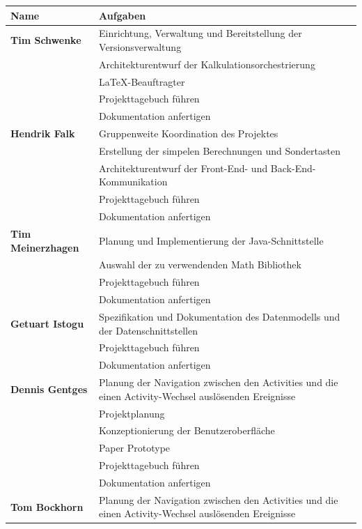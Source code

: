 {\def\arraystretch{1.25}\tabcolsep=5pt
\begin{longtable}{|l|p{26em}|}
	\hline
	\textbf{Name} & \textbf{Aufgaben}
	\\ \hline \hline
	\endfirsthead
	
	\hline
	\endhead
	
	\hline
	\endfoot

	\textbf{Tim Schwenke} 
		& Einrichtung, Verwaltung und Bereitstellung der Versionsverwaltung \\
		& Architekturentwurf der Kalkulationsorchestrierung \\
		& LaTeX-Beauftragter \\
		& Projekttagebuch führen \\
		& Dokumentation anfertigen \\
	\hline
	\textbf{Hendrik Falk}
		& Gruppenweite Koordination des Projektes \\
		& Erstellung der simpelen Berechnungen und Sondertasten \\
		& Architekturentwurf der Front-End- und Back-End-Kommunikation \\
		& Projekttagebuch führen \\
		& Dokumentation anfertigen \\
	\hline
 	\textbf{Tim Meinerzhagen}
		& Planung und Implementierung der Java-Schnittstelle \\
		& Auswahl der zu verwendenden Math Bibliothek \\
		& Projekttagebuch führen \\
		& Dokumentation anfertigen \\
	\hline
	\textbf{Getuart Istogu}
		& Spezifikation und Dokumentation des Datenmodells und der Datenschnittstellen \\
		& Projekttagebuch führen \\
		& Dokumentation anfertigen \\
	\hline
	\textbf{Dennis Gentges}
		& Planung der Navigation zwischen den Activities und die einen Activity-Wechsel auslösenden Ereignisse \\
		& Projektplanung \\
		& Konzeptionierung der Benutzeroberfläche \\
		& Paper Prototype \\
		& Projekttagebuch führen \\
		& Dokumentation anfertigen \\
	\hline
	\textbf{Tom Bockhorn}
		& Planung der Navigation zwischen den Activities und die einen Activity-Wechsel auslösenden Ereignisse \\

\end{longtable}}
